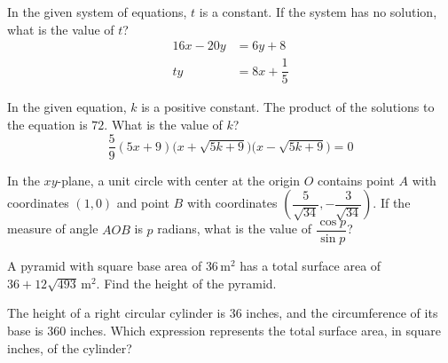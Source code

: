\vspace{0.75em}


\vspace{2em}
\newpage

\noindent\markforreview
\vspace{1em}

In the given system of equations, \(t\) is a constant. If the system has no solution, what is the value of \(t\)?
\[
\begin{aligned}
16x - 20y &= 6y + 8 \\
ty &= 8x + \dfrac{1}{5}
\end{aligned}
\]

\vspace{2em}
\newpage

\noindent\markforreview
\vspace{1em}

In the given equation, \(k\) is a positive constant. The product of the solutions to the equation is \(72\). What is the value of \(k\)?
\[
\dfrac{5}{9}(5x + 9)\bigl(x + \sqrt{5k + 9}\bigr)\bigl(x - \sqrt{5k + 9}\bigr) = 0
\]

\vspace{2em}
\newpage

\noindent\markforreview
\vspace{1em}

In the \(xy\)-plane, a unit circle with center at the origin \(O\) contains point \(A\) with coordinates \((1, 0)\) and point \(B\) with coordinates \(\left(\dfrac{5}{\sqrt{34}}, -\dfrac{3}{\sqrt{34}}\right)\). If the measure of angle \(AOB\) is \(p\) radians, what is the value of \(\dfrac{\cos p}{\sin p}\)?

\vspace{2em}
\newpage

\noindent\markforreview
\vspace{1em}

A pyramid with square base area of \(36\,\text{m}^{2}\) has a total surface area of \(36 + 12\sqrt{493}\,\text{m}^{2}\). Find the height of the pyramid.

\vspace{2em}
\newpage

\noindent\markforreview
\vspace{1em}

The height of a right circular cylinder is \(36\) inches, and the circumference of its base is \(360\) inches. Which expression represents the total surface area, in square inches, of the cylinder?


